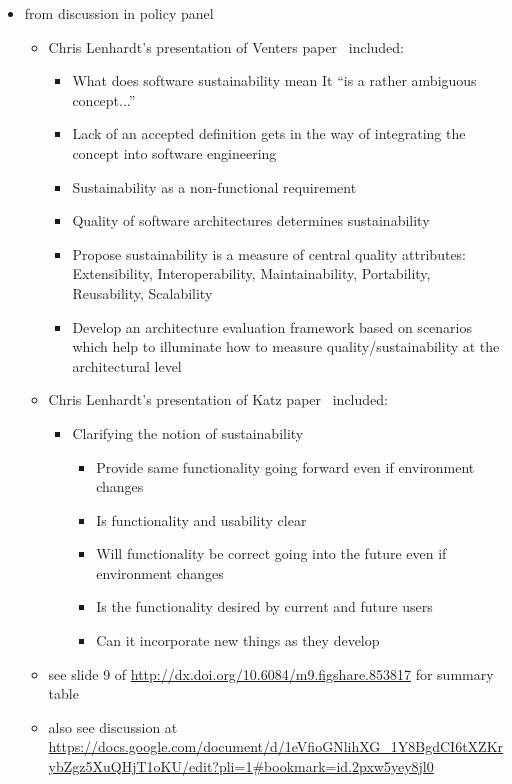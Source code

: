 \documentclass[11pt, oneside]{amsart}
\begin{document}
\begin{itemize}
\item from discussion in policy panel

\begin{itemize}
\item Chris Lenhardt's presentation of Venters
  paper~\cite{Venters_WSSSPE} included:

\begin{itemize}
\item What does software sustainability mean
It ``is a rather ambiguous concept...''
\item Lack of an accepted definition gets in the way of integrating
  the concept into software engineering
\item Sustainability as a non-functional requirement
\item Quality of software architectures determines sustainability
\item Propose sustainability is a measure of central quality
  attributes: Extensibility, Interoperability, Maintainability,
  Portability, Reusability, Scalability
\item Develop an architecture evaluation framework based on scenarios
  which help to illuminate how to measure quality/sustainability at
  the architectural level
\end{itemize}

\item Chris Lenhardt's presentation of Katz paper~\cite{Katz_WSSSPE}
  included:
\begin{itemize}
\item Clarifying the notion of sustainability
\begin{itemize}
\item Provide same functionality going forward even if environment changes
\item Is functionality and usability clear
\item Will functionality be correct going into the future even if
  environment changes
\item Is the functionality desired by current and future users
\item Can it incorporate new things as they develop
\end{itemize}
\end{itemize}

\item see slide 9 of
  \url{http://dx.doi.org/10.6084/m9.figshare.853817} for summary table

\item also see discussion at \url{https://docs.google.com/document/d/1eVfioGNlihXG_1Y8BgdCI6tXZKrybZgz5XuQHjT1oKU/edit?pli=1#bookmark=id.2pxw5yey8jl0}

\end{itemize}

\end{itemize}
\end{document}
